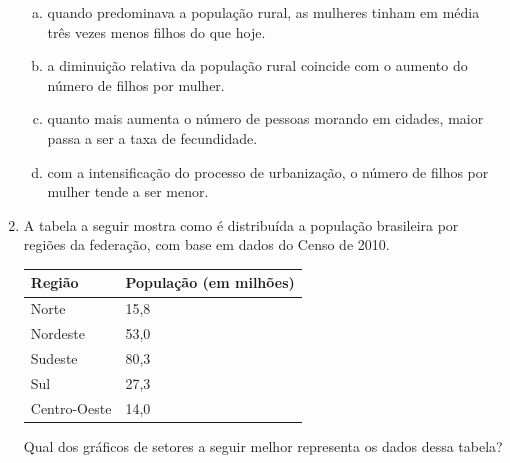 \documentclass[a4paper,14pt]{article}
\begin{document}
\begin{multicols}{2}
\begin{enumerate}
\begin{enumerate}[a)]
				\item quando predominava a população rural, as mulheres tinham em média três vezes menos filhos do que hoje.
				\item a diminuição relativa da população rural coincide com o aumento do número de filhos por mulher.
				\item quanto mais aumenta o número de pessoas morando em cidades, maior passa a ser a taxa de fecundidade.
				\item com a intensificação do processo de urbanização, o número de filhos por mulher tende a ser menor. \newpage
			\end{enumerate}
			\item A tabela a seguir mostra como é distribuída a população brasileira por regiões da federação, com base em dados do Censo de 2010.
			\begin{table}[H]
				\begin{tabular}{|p{3.5cm}|p{3.5cm}|}
					\hline
					\textbf{Região} & \textbf{População (em milhões)}  \\ \hline
					Norte & 15,8  \\ \hline
					Nordeste & 53,0 \\ \hline
					Sudeste & 80,3 \\ \hline
					Sul & 27,3 \\ \hline
					Centro-Oeste & 14,0  \\ \hline
				\end{tabular}
			\end{table}
			Qual dos gráficos de setores a seguir melhor representa os dados dessa tabela?
			\\

\end{enumerate}
\end{multicols}
\end{document}
